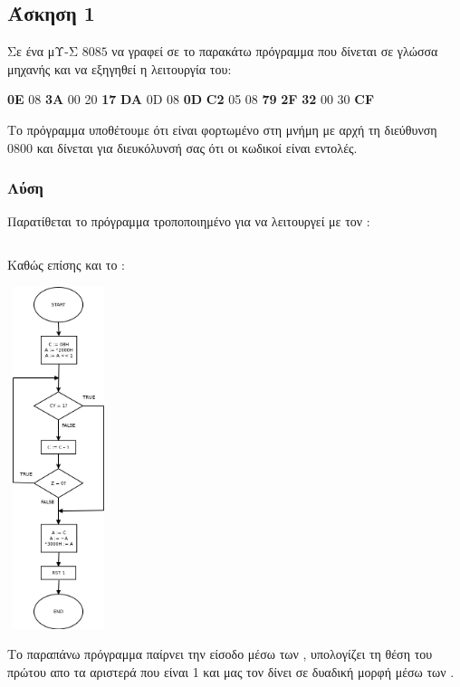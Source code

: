 \newpage\subsection*{Άσκηση 1}

Σε ένα μΥ-Σ $8085$ να γραφεί σε  το παρακάτω πρόγραμμα που δίνεται σε γλώσσα μηχανής και να εξηγηθεί η
λειτουργία του:

\begin{center}
    \textbf{0E} 08 \textbf{3A} 00 20 \textbf{17} \textbf{DA} 0D 08 \textbf{0D} \textbf{C2} 05 08 \textbf{79} \textbf{2F} \textbf{32} 00 30 \textbf{CF}
\end{center}

Το πρόγραμμα υποθέτουμε ότι είναι φορτωμένο στη μνήμη με αρχή τη διεύθυνση 0800 και δίνεται για διευκόλυνσή σας ότι
οι  κωδικοί είναι εντολές.

\subsubsection*{Λύση}

Παρατίθεται το πρόγραμμα τροποποιημένο για να λειτουργεί με τον :

    \inputminted{text}{askisi1.8085}

Καθώς επίσης και το :


\begin{center}
    \includegraphics[width=3cm, height=10cm, center]{Diagram1.png}
\end{center}


Το παραπάνω πρόγραμμα παίρνει την είσοδο μέσω των , υπολογίζει τη θέση του πρώτου απο τα αριστερά 
που είναι 1 και μας τον δίνει σε δυαδική μορφή μέσω των .
